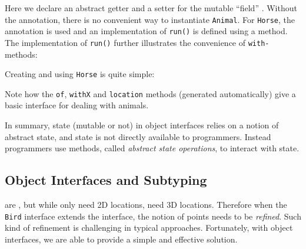 \noindent Here we declare an abstract getter and a setter for the mutable ``field''
\Q@location@.  Without the \mixin annotation, there is no convenient way to
instantiate \texttt{Animal}.  For \texttt{Horse}, the \mixin annotation is used
and an implementation of \texttt{run()} is defined using a \Q@default@
method. The implementation of \texttt{run()} further illustrates the convenience of \texttt{with-} methods:


\noindent Creating and using \texttt{Horse} is quite simple:


\noindent Note how the \texttt{of}, \texttt{withX} and
\texttt{location} methods (generated automatically) give a
basic interface for dealing with animals.

In summary, state (mutable or not) in object interfaces
relies on a notion of abstract state, and state is not directly
available to programmers. Instead programmers use methods, called
\emph{abstract state operations}, to interact with state.


\subsection{Object Interfaces and Subtyping}
\Q@Bird@s are \Q@Animal@s, but while \Q@Animal@s only need 2D
locations, \Q@Bird@s need 3D locations. Therefore when the \texttt{Bird}
interface extends the \Q@Animal@ interface, the notion of points needs to
be \emph{refined}. Such kind of refinement is challenging
in typical \classbased approaches. Fortunately, with object interfaces,
we are able to provide a simple and effective solution.

